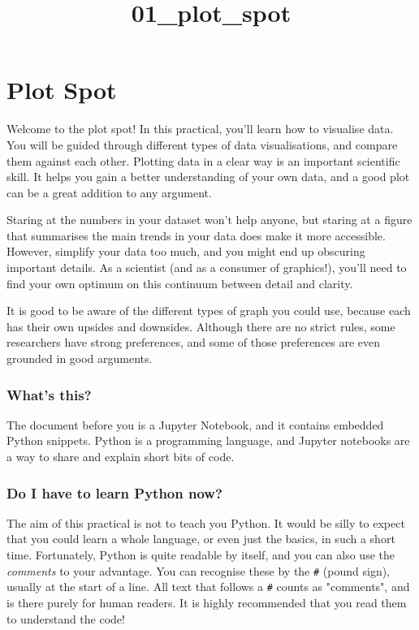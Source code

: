 \documentclass[11pt]{article}
\title{01\_plot\_spot}
\begin{document}
    
    
    \maketitle
    
    

    
    \section{Plot Spot}\label{plot-spot}

    Welcome to the plot spot! In this practical, you'll learn how to
visualise data. You will be guided through different types of data
visualisations, and compare them against each other. Plotting data in a
clear way is an important scientific skill. It helps you gain a better
understanding of your own data, and a good plot can be a great addition
to any argument.

Staring at the numbers in your dataset won't help anyone, but staring at
a figure that summarises the main trends in your data does make it more
accessible. However, simplify your data too much, and you might end up
obscuring important details. As a scientist (and as a consumer of
graphics!), you'll need to find your own optimum on this continuum
between detail and clarity.

It is good to be aware of the different types of graph you could use,
because each has their own upsides and downsides. Although there are no
strict rules, some researchers have strong preferences, and some of
those preferences are even grounded in good arguments.

\subsubsection{What's this?}\label{whats-this}

The document before you is a Jupyter Notebook, and it contains embedded
Python snippets. Python is a programming language, and Jupyter notebooks
are a way to share and explain short bits of code.

\subsubsection{Do I have to learn Python
now?}\label{do-i-have-to-learn-python-now}

The aim of this practical is not to teach you Python. It would be silly
to expect that you could learn a whole language, or even just the
basics, in such a short time. Fortunately, Python is quite readable by
itself, and you can also use the \emph{comments} to your advantage. You
can recognise these by the \texttt{\#} (pound sign), usually at the
start of a line. All text that follows a \texttt{\#} counts as
"comments", and is there purely for human readers. It is highly
recommended that you read them to understand the code!
\end{document}
